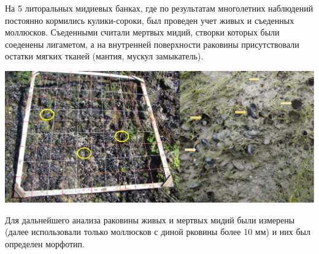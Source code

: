 \documentclass[a0,portrait]{a0poster}
\begin{document}
\begin{multicols}{2}
%
\begin{minipage}[t]{0.4\linewidth}
На 5 литоральных мидиевых банках, где по результатам многолетних наблюдений постоянно кормились кулики-сороки, был проведен учет живых и съеденных моллюсков. Съеденными считали мертвых мидий, створки которых были соеденены лигаметом, а на внутренней поверхности раковины присутствовали остатки мягких тканей (мантия, мускул замыкатель).  
\end{minipage}\hspace{1cm}
%
\begin{minipage}[t]{0.5\linewidth}		
	\begin{center}\vspace{0.1cm}
			\includegraphics[width=0.8\linewidth]{Samples_oystercatchers.jpg}
			\label{Fig_setup}
		\end{center}
\end{minipage}

\vspace{0.5cm}


Для дальнейшего анализа раковины живых и мертвых мидий были измерены (далее использовали только моллюсков с диной рковины более 10 мм) и них был определен морфотип.  






\section*{}

\vspace{0.5cm}




\end{multicols}
\end{document}
